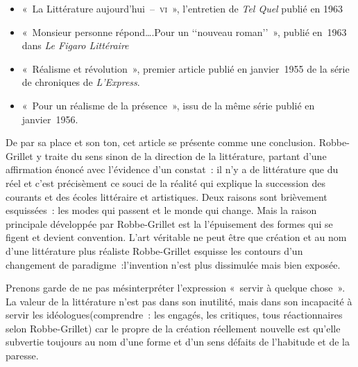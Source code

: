 \documentclass[12pt, a4paper]{article}
\begin{document}
\begin{itemize}

    \item «~La Littérature aujourd'hui~–~\textsc{vi}~», l'entretien de \textit{Tel Quel} publié en 1963

    \item «~Monsieur personne répond….Pour un ‘‘nouveau roman’’~», publié en~1963 dans \textit{Le Figaro Littéraire}

    \item «~Réalisme et révolution~», premier article publié en janvier~1955 de la série de chroniques de \textit{L'Express}.

    \item «~Pour un réalisme de la présence~», issu de la même série publié en janvier~1956.
\end{itemize}
De par sa place et son ton, cet article se présente comme une conclusion. Robbe-Grillet y traite du sens sinon de la direction de la littérature, partant d'une affirmation énoncé avec l'évidence d'un constat~: il n'y a de littérature que du réel et c'est précisèment ce souci de la réalité qui explique la succession des courants et des écoles littéraire et artistiques. Deux raisons sont brièvement esquissées~: les modes qui passent et le monde qui change. Mais la raison principale développée par Robbe-Grillet est la l'épuisement des formes qui se figent et devient convention. L'art véritable ne peut être que création et au nom d'une littérature plus réaliste Robbe-Grillet esquisse les contours d'un changement de paradigme~:l'invention n'est plus dissimulée mais bien exposée.

Prenons garde de ne pas mésinterpréter l'expression «~servir à quelque chose~». La valeur de la littérature n'est pas dans son inutilité, mais dans son incapacité à servir les idéologues(comprendre~: les engagés, les critiques, tous réactionnaires selon Robbe-Grillet) car le propre de la création réellement nouvelle est qu'elle subvertie toujours au nom d'une forme et d'un sens défaits de l'habitude et de la paresse.





 

    
\end{document}
